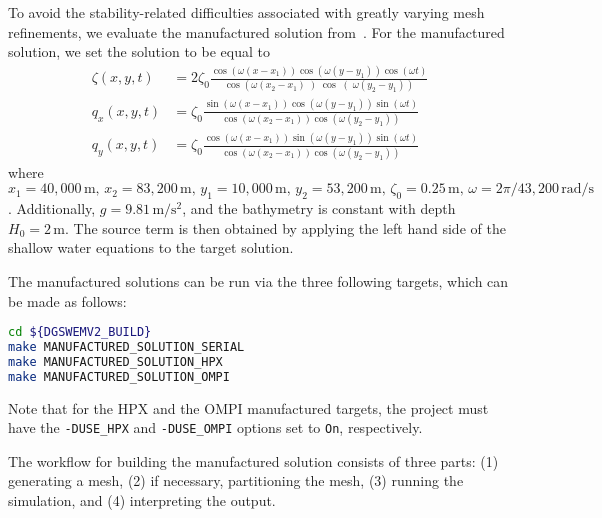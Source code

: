 To avoid the stability-related difficulties associated with greatly varying mesh refinements, we evaluate the manufactured solution from~\cite{Wiraset2014}. For the manufactured solution, we set the solution to be equal to
\begin{align}
\zeta(x,y,t) &= 2 \zeta_0 \frac{ \cos \left( \omega(x - x_1) \right) \cos \left( \omega(y - y_1)\right) \cos(\omega t)}{
\cos \left( \omega(x_2 - x_1)\left) \cos \right( \omega(y_2 - y_1)\right)} \nonumber \\
q_x(x,y,t) &= \zeta_0 \frac{ \sin \left(\omega(x - x_1)\right) \cos\left(\omega(y - y_1)\right) \sin(\omega t)}{\cos\left( \omega ( x_2 - x_1)\right) \cos\left(\omega ( y_2 - y_1)\right)} \nonumber \\
q_y(x,y,t) &= \zeta_0 \frac{ \cos\left(\omega (x - x_1)\right) \sin\left( \omega(y -y_1)\right) \sin( \omega t)}{\cos \left( \omega ( x_ 2 - x_1)\right) \cos\left( \omega(y_2 - y_1)\right)} \nonumber
\end{align}
where $x_1 = 40,000\,\mathrm{m},\, x_2= 83,200\,\mathrm{m},\, y_1 = 10,000\,\mathrm{m},\,y_2 = 53,200\,\mathrm{m},\,\zeta_0 = 0.25\,\mathrm{m},\, \omega = 2 \pi/43,200\, \mathrm{rad}/\mathrm{s}$. Additionally, $g=9.81\,\mathrm{m}/\mathrm{s}^2$, and the bathymetry is constant with depth $H_0=2\,\mathrm{m}$. The source term is then obtained by applying the left hand side of the shallow water equations to the target solution.

The manufactured solutions can be run via the three following targets, which can be made as follows:
\begin{lstlisting}[language=bash]
cd ${DGSWEMV2_BUILD}
make MANUFACTURED_SOLUTION_SERIAL
make MANUFACTURED_SOLUTION_HPX
make MANUFACTURED_SOLUTION_OMPI
\end{lstlisting}
Note that for the HPX and the OMPI manufactured targets, the project must have the \lstinline{-DUSE_HPX} and \lstinline{-DUSE_OMPI} options set to \lstinline{On}, respectively.

The workflow for building the manufactured solution consists of three parts: (1) generating a mesh, (2) if necessary, partitioning the mesh, (3) running the simulation, and (4) interpreting the output.

